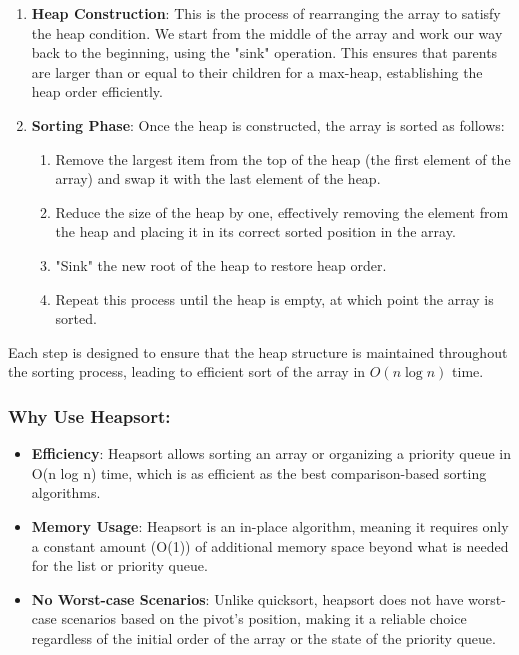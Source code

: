 \documentclass{article}
\begin{document}
\begin{enumerate}
    \item \textbf{Heap Construction}: This is the process of rearranging the array to satisfy the heap condition. We start from the middle of the array and work our way back to the beginning, using the "sink" operation. This ensures that parents are larger than or equal to their children for a max-heap, establishing the heap order efficiently.

    \item \textbf{Sorting Phase}: Once the heap is constructed, the array is sorted as follows:
        \begin{enumerate}
            \item Remove the largest item from the top of the heap (the first element of the array) and swap it with the last element of the heap.
            \item Reduce the size of the heap by one, effectively removing the element from the heap and placing it in its correct sorted position in the array.
            \item "Sink" the new root of the heap to restore heap order.
            \item Repeat this process until the heap is empty, at which point the array is sorted.
        \end{enumerate}
\end{enumerate}

Each step is designed to ensure that the heap structure is maintained throughout the sorting process, leading to efficient sort of the array in $O(n \log n)$ time.

\subsubsection*{Why Use Heapsort:}
\begin{itemize}
    \item \textbf{Efficiency}: Heapsort allows sorting an array or organizing a priority queue in O(n log n) time, which is as efficient as the best comparison-based sorting algorithms.
    \item \textbf{Memory Usage}: Heapsort is an in-place algorithm, meaning it requires only a constant amount (O(1)) of additional memory space beyond what is needed for the list or priority queue.
    \item \textbf{No Worst-case Scenarios}: Unlike quicksort, heapsort does not have worst-case scenarios based on the pivot's position, making it a reliable choice regardless of the initial order of the array or the state of the priority queue.
\end{itemize}
\end{document}
